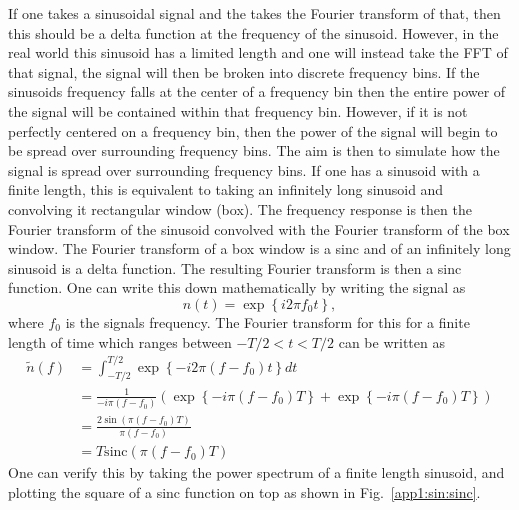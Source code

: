 If one takes a sinusoidal signal and the takes the Fourier transform of that, then this should be a delta function at the frequency of the sinusoid. 
However, in the real world this sinusoid has a limited length and one will instead take the \gls{FFT} of that signal, the signal will then be broken into discrete frequency bins.
If the sinusoids frequency falls at the center of a frequency bin then the entire power of the signal will be contained within that frequency bin.
However, if it is not perfectly centered on a frequency bin, then the power of the signal will begin to be spread over surrounding frequency bins. 
The aim is then to simulate how the signal is spread over surrounding frequency bins.
If one has a sinusoid with a finite length, this is equivalent to taking an infinitely long sinusoid and convolving it rectangular window (box). 
The frequency response is then the Fourier transform of the sinusoid convolved with the Fourier transform of the box window.
The Fourier transform of a box window is a sinc and of an infinitely long sinusoid is a delta function. 
The resulting Fourier transform is then a sinc function.
One can write this down mathematically by writing the signal as
\begin{equation}
 n(t) = \exp{\left\{  i 2 \pi f_0 t \right\}},
\end{equation}
where $f_0$ is the signals frequency.
The Fourier transform for this for a finite length of time which ranges between $-T/2 < t < T/2$ can be written as
\begin{equation}
\begin{split}
\tilde{n}(f) &= \int_{-T/2}^{T/2} \exp{\left\{  -i 2 \pi(f -  f_0) t \right\}} dt \\
&= \frac{1}{-i\pi (f - f_0)} \left( \exp{\left\{  -i \pi(f -  f_0) T \right\}} + \exp{\left\{  -i \pi(f -  f_0) T \right\}}      \right) \\
&= \frac{2 \sin{\left( \pi (f - f_0) T \right)}}{ \pi (f - f_0)} \\
&= T \mathrm{sinc} \left( \pi(f-f_0)T\right)
\end{split}
\end{equation}
 One can verify this by taking the power spectrum of a finite length sinusoid, and plotting the square of a sinc function on top as shown in Fig.~\ref{app1:sin:sinc}.


